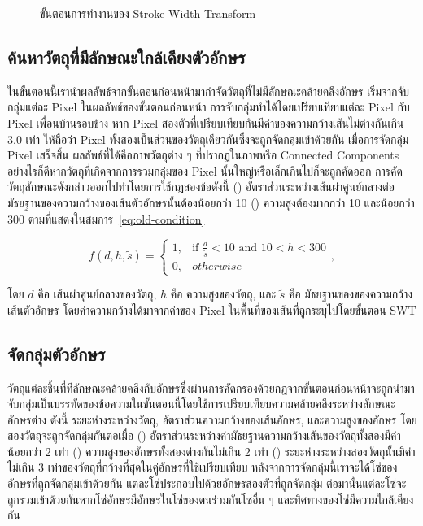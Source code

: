 \begin{figure}[!h]
    \centering
    \caption{ขั้นตอนการทำงานของ Stroke Width Transform}
    \label{Fig:swt}
\end{figure}

\subsection{ค้นหาวัตถุที่มีลักษณะใกล้เคียงตัวอักษร}

ในขั้นตอนนี้เรานำผลลัพธ์จากขั้นตอนก่อนหน้ามากำจัดวัตถุที่ไม่มีลักษณะคล้ายคลึงอักษร เริ่มจากจับกลุ่มแต่ละ Pixel ในผลลัพธ์ของขั้นตอนก่อนหน้า การจับกลุ่มทำได้โดยเปรียบเทียบแต่ละ Pixel กับ Pixel เพื่อนบ้านรอบข้าง หาก Pixel สองตัวที่เปรียบเทียบกันมีค่าของความกว้างเส้นไม่ต่างกันเกิน 3.0  เท่า ให้ถือว่า Pixel ทั้งสองเป็นส่วนของวัตถุเดียวกันซึ่งจะถูกจัดกลุ่มเข้าด้วยกัน เมื่อการจัดกลุ่ม Pixel เสร็จสิ้น ผลลัพธ์ที่ได้คือภาพวัตถุต่าง ๆ ที่ปรากฏในภาพหรือ Connected Components อย่างไรก็ดีหากวัตถุที่เกิดจากการรวมกลุ่มของ Pixel นั้นใหญ่หรือเล็กเกินไปก็จะถูกคัดออก การคัดวัตถุลักษณะดังกล่าวออกไปทำโดยการใช้กฎสองข้อดังนี้ () อัตราส่วนระหว่างเส้นผ่าศูนย์กลางต่อมัธยฐานของความกว้างของเส้นตัวอักษรนั้นต้องน้อยกว่า 10  () ความสูงต้องมากกว่า 10 และน้อยกว่า 300 ตามที่แสดงในสมการ~\ref{eq:old-condition}


\begin{equation}
f(d, h, \tilde{s})= 
\begin{cases}
1, &\text{if } \frac{d}{\tilde{s}} < 10 \text{ and } 10 < h < 300\\
0, &otherwise
\end{cases},
\label{eq:old-condition}
\end{equation}

โดย $d$ คือ เส้นผ่าศูนย์กลางของวัตถุ, $h$ คือ ความสูงของวัตถุ, และ $\tilde{s}$ คือ มัธยฐานของของความกว้างเส้นตัวอักษร โดยค่าความกว้างได้มาจากค่าของ Pixel ในพื้นที่ของเส้นที่ถูกระบุไปโดยขั้นตอน SWT

\subsection{จัดกลุ่มตัวอักษร}

วัตถุแต่ละชิ้นที่ทีลักษณะคล้ายคลึงกับอักษรซึ่งผ่านการคัดกรองด้วยกฎจากขั้นตอนก่อนหน้าจะถูกนำมาจับกลุ่มเป็นบรรทัดของข้อความในขั้นตอนนี้โดยใช้การเปรียบเทียบความคล้ายคลึงระหว่างลักษณะอักษรต่าง ดังนี้ ระยะห่างระหว่างวัตถุ, อัตราส่วนความกว้างของเส้นอักษร, และความสูงของอักษร โดยสองวัตถุจะถูกจัดกลุ่มกันต่อเมื่อ () อัตราส่วนระหว่างค่ามัธยฐานความกว้างเส้นของวัตถุทั้งสองมีค่าน้อยกว่า 2 เท่า () ความสูงของอักษรทั้งสองต่างกันไม่เกิน 2 เท่า () ระยะห่างระหว่างสองวัตถุนั้นมีค่าไม่เกิน 3 เท่าของวัตถุที่กว้างที่สุดในคู่อักษรที่ใช้เปรียบเทียบ หลังจากการจัดกลุ่มนี้เราจะได้โซ่ของอักษรที่ถูกจัดกลุ่มเข้าด้วยกัน แต่ละโซ่ประกอบไปด้วยอักษรสองตัวที่ถูกจัดกลุ่ม ต่อมานั้นแต่ละโซ่จะถูกรวมเข้าด้วยกันหากโซ่อักษรมีอักษรในโซ่ของตนร่วมกันโซ่อื่น ๆ และทิศทางของโซ่มีความใกล้เคียงกัน

